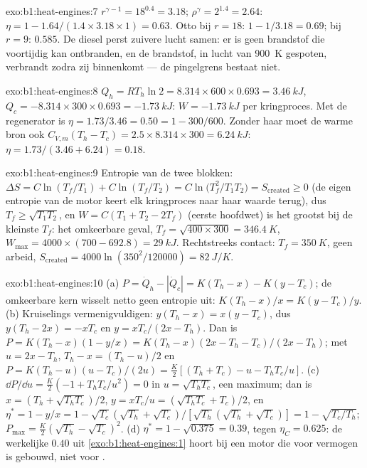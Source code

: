 \begin{solution}{exo:b1:heat-engines:7}
$r^{\gamma-1} = 18^{0.4} = 3.18$; $\rho^\gamma = 2^{1.4} = 2.64$: $\eta = 1 -
1.64/(1.4 \times 3.18 \times 1) = 0.63$. Otto bij $r = 18$: $1 - 1/3.18 = 0.69$;
bij $r = 9$: $0.585$. De diesel perst zuivere lucht samen: er is geen brandstof die
voortijdig kan ontbranden, en de brandstof, in lucht van \qty{900}{K} gespoten, verbrandt zodra
zij binnenkomt --- de pingelgrens bestaat niet.
\end{solution}

\begin{solution}{exo:b1:heat-engines:8}
$Q_h = RT_h\ln2 = 8.314 \times 600 \times 0.693 = \qty{3.46}{kJ}$, $Q_c = -8.314
\times 300 \times 0.693 = \qty{-1.73}{kJ}$: $W = \qty{-1.73}{kJ}$ per kringproces. Met
de regenerator is $\eta = 1.73/3.46 = 0.50 = 1 - 300/600$. Zonder haar moet de warme
bron ook $C_{V,m}(T_h - T_c) = 2.5 \times 8.314 \times 300 =
\qty{6.24}{kJ}$: $\eta = 1.73/(3.46 + 6.24) = 0.18$.
\end{solution}

\begin{solution}{exo:b1:heat-engines:9}
Entropie van de twee blokken: $\Delta S = C\ln(T_f/T_1) + C\ln(T_f/T_2) =
C\ln\bigl(T_f^2/T_1T_2\bigr) = S_{\mathrm{created}} \geq 0$ (de eigen entropie van de
motor keert elk kringproces naar haar waarde terug), dus $T_f \geq \sqrt{T_1T_2}$, en
$W = C(T_1 + T_2 - 2T_f)$ (eerste hoofdwet) is het grootst bij de kleinste $T_f$:
het omkeerbare geval, $T_f = \sqrt{400 \times 300} = \qty{346.4}{K}$,
$W_{\max} = 4000 \times (700 - 692.8) = \qty{29}{kJ}$. Rechtstreeks contact: $T_f =
\qty{350}{K}$, geen arbeid, $S_{\mathrm{created}} = 4000\ln(350^2/120000) =
\qty{82}{J/K}$.
\end{solution}

\begin{solution}{exo:b1:heat-engines:10}
(a) $P = \dot Q_h - |\dot Q_c| = K(T_h - x) - K(y - T_c)$; de omkeerbare kern
wisselt netto geen entropie uit: $K(T_h - x)/x = K(y - T_c)/y$. (b) Kruiselings vermenigvuldigen:
$y(T_h - x) = x(y - T_c)$, dus $y(T_h - 2x) = -xT_c$ en $y = xT_c/(2x - T_h)$.
Dan is $P = K(T_h - x)(1 - y/x) = K(T_h - x)(2x - T_h - T_c)/(2x - T_h)$; met
$u = 2x - T_h$, $T_h - x = (T_h - u)/2$ en $P = K(T_h - u)(u - T_c)/(2u) =
\tfrac{K}{2}[(T_h + T_c) - u - T_hT_c/u]$. (c) $\dd P/\dd u = \tfrac K2(-1 +
T_hT_c/u^2) = 0$ in $u = \sqrt{T_hT_c}$, een maximum; dan is $x = (T_h +
\sqrt{T_hT_c})/2$, $y = xT_c/u = (\sqrt{T_hT_c} + T_c)/2$, en $\eta^\ast = 1 - y/x
= 1 - \sqrt{T_c}(\sqrt{T_h} + \sqrt{T_c})/[\sqrt{T_h}(\sqrt{T_h} + \sqrt{T_c})] = 1 -
\sqrt{T_c/T_h}$; $P_{\max} = \tfrac K2(\sqrt{T_h} - \sqrt{T_c})^2$. (d)
$\eta^\ast = 1 - \sqrt{0.375} = 0.39$, tegen $\eta_C = 0.625$: de werkelijke $0.40$
uit \cref{exo:b1:heat-engines:1} hoort bij een motor die voor vermogen is gebouwd, niet
voor .
\end{solution}

